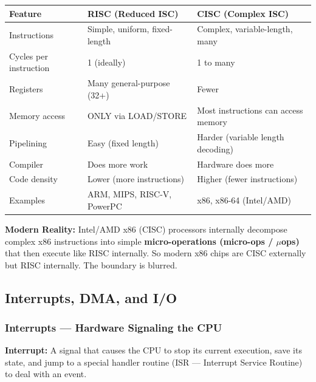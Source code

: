 \documentclass[11pt,a4paper]{article}
\begin{document}
\begin{center}
\begin{tabularx}{\linewidth}{L{4.5cm} X X}
\toprule
\textbf{Feature} & \textbf{RISC (Reduced ISC)} & \textbf{CISC (Complex ISC)} \\
\midrule
Instructions & Simple, uniform, fixed-length & Complex, variable-length, many \\
Cycles per instruction & 1 (ideally) & 1 to many \\
Registers & Many general-purpose (32+) & Fewer \\
Memory access & ONLY via LOAD/STORE & Most instructions can access memory \\
Pipelining & Easy (fixed length) & Harder (variable length decoding) \\
Compiler & Does more work & Hardware does more \\
Code density & Lower (more instructions) & Higher (fewer instructions) \\
Examples & ARM, MIPS, RISC-V, PowerPC & x86, x86-64 (Intel/AMD) \\
\bottomrule
\end{tabularx}
\end{center}

\begin{notebox}
\textbf{Modern Reality:} Intel/AMD x86 (CISC) processors internally decompose complex x86 instructions into simple \textbf{micro-operations (micro-ops / $\mu$ops)} that then execute like RISC internally. So modern x86 chips are CISC externally but RISC internally. The boundary is blurred.
\end{notebox}

\subsection{Interrupts, DMA, and I/O}

\subsubsection{Interrupts --- Hardware Signaling the CPU}

\begin{mydef}
\textbf{Interrupt:} A signal that causes the CPU to stop its current execution, save its state, and jump to a special handler routine (ISR --- Interrupt Service Routine) to deal with an event.
\end{mydef}
\end{document}
